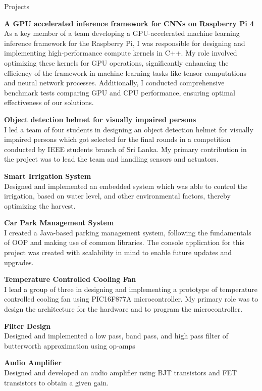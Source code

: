 \documentclass[
	11pt, %
]{./assets/resume} %
\begin{document}

\begin{rSection}{Projects}

	\textbf{A GPU accelerated inference framework for CNNs on Raspberry Pi 4} \\
	As a key member of a team developing a GPU-accelerated machine learning inference framework for the Raspberry Pi, I was responsible for designing and implementing high-performance compute kernels in C++. My role involved optimizing these kernels for GPU operations, significantly enhancing the efficiency of the framework in machine learning tasks like tensor computations and neural network processes. Additionally, I conducted comprehensive benchmark tests comparing GPU and CPU performance, ensuring optimal effectiveness of our solutions.

	\textbf{Object detection helmet for visually impaired persons} \\
	I led a team of four students in designing an object detection helmet for visually impaired persons which got selected for the final rounds in a competition conducted by IEEE students branch of Sri Lanka. My primary contribution in the project was to lead the team and handling sensors and actuators.

	\textbf{Smart Irrigation System} \\
	Designed and implemented an embedded system which was able to control the irrigation, based on water level, and other environmental factors, thereby optimizing the harvest.

	\textbf{Car Park Management System} \\
	I created a Java-based parking management system, following the fundamentals of OOP and making use of common libraries. The console application for this project was created with scalability in mind to enable future updates and upgrades.

	\textbf{Temperature Controlled Cooling Fan} \\
	I lead a group of three in designing and implementing a prototype of temperature controlled cooling fan using PIC16F877A microcontroller. My primary role was to design the architecture for the hardware and to program the microcontroller.

	\textbf{Filter Design} \\
	Designed and implemented a low pass, band pass, and high pass filter of butterworth approximation using op-amps

	\textbf{Audio Amplifier} \\
	Designed and developed an audio amplifier using BJT transistors and FET transistors to obtain a given gain.

\end{rSection}
\end{document}

